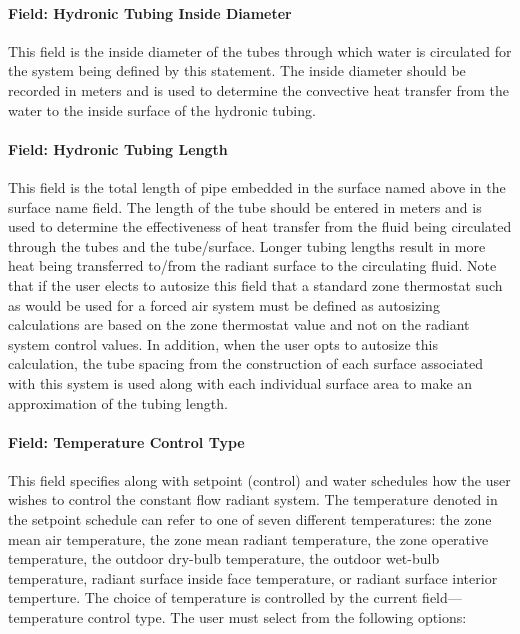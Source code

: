 \paragraph{Field: Hydronic Tubing Inside Diameter}\label{field-hydronic-tubing-inside-diameter-1-000}

This field is the inside diameter of the tubes through which water is circulated for the system being defined by this statement. The inside diameter should be recorded in meters and is used to determine the convective heat transfer from the water to the inside surface of the hydronic tubing.

\paragraph{Field: Hydronic Tubing Length}\label{field-hydronic-tubing-length-1}

This field is the total length of pipe embedded in the surface named above in the surface name field. The length of the tube should be entered in meters and is used to determine the effectiveness of heat transfer from the fluid being circulated through the tubes and the tube/surface. Longer tubing lengths result in more heat being transferred to/from the radiant surface to the circulating fluid. Note that if the user elects to autosize this field that a standard zone thermostat such as would be used for a forced air system must be defined as autosizing calculations are based on the zone thermostat value and not on the radiant system control values. In addition, when the user opts to autosize this calculation, the tube spacing from the construction of each surface associated with this system is used along with each individual surface area to make an approximation of the tubing length.

\paragraph{Field: Temperature Control Type}\label{field-temperature-control-type-1}

This field specifies along with setpoint (control) and water schedules how the user wishes to control the constant flow radiant system. The temperature denoted in the setpoint schedule can refer to one of seven different temperatures: the zone mean air temperature, the zone mean radiant temperature, the zone operative temperature, the outdoor dry-bulb temperature, the outdoor wet-bulb temperature, radiant surface inside face temperature, or radiant surface interior temperture. The choice of temperature is controlled by the current field---temperature control type. The user must select from the following options:

